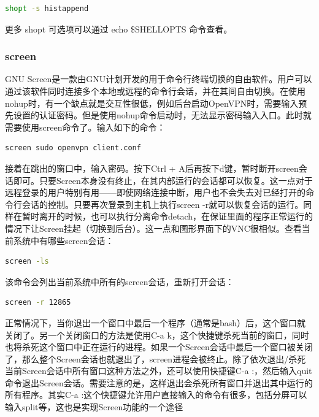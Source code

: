 \documentclass[letter]{book}
\begin{document}
\begin{lstlisting}[language=Bash]
shopt -s histappend
\end{lstlisting}

更多 shopt 可选项可以通过 echo \$SHELLOPTS 命令查看。



\subsubsection{screen}

GNU Screen是一款由GNU计划开发的用于命令行终端切换的自由软件。用户可以通过该软件同时连接多个本地或远程的命令行会话，并在其间自由切换。在使用nohup时，有一个缺点就是交互性很低，例如后台启动OpenVPN时，需要输入预先设置的认证密码。但是使用nohup命令启动时，无法显示密码输入入口。此时就需要使用screen命令了。输入如下的命令：

\begin{lstlisting}[language=Bash]
screen sudo openvpn client.conf
\end{lstlisting}

接着在跳出的窗口中，输入密码。按下Ctrl + A后再按下d键，暂时断开screen会话即可。只要Screen本身没有终止，在其内部运行的会话都可以恢复。这一点对于远程登录的用户特别有用——即使网络连接中断，用户也不会失去对已经打开的命令行会话的控制。只要再次登录到主机上执行screen -r就可以恢复会话的运行。同样在暂时离开的时候，也可以执行分离命令detach，在保证里面的程序正常运行的情况下让Screen挂起（切换到后台）。这一点和图形界面下的VNC很相似。查看当前系统中有哪些screen会话：

\begin{lstlisting}[language=Bash]
screen -ls
\end{lstlisting}

该命令会列出当前系统中所有的screen会话，重新打开会话：

\begin{lstlisting}[language=Bash]
screen -r 12865
\end{lstlisting}

正常情况下，当你退出一个窗口中最后一个程序（通常是bash）后，这个窗口就关闭了。另一个关闭窗口的方法是使用C-a k，这个快捷键杀死当前的窗口，同时也将杀死这个窗口中正在运行的进程。如果一个Screen会话中最后一个窗口被关闭了，那么整个Screen会话也就退出了，screen进程会被终止。除了依次退出/杀死当前Screen会话中所有窗口这种方法之外，还可以使用快捷键C-a :，然后输入quit命令退出Screen会话。需要注意的是，这样退出会杀死所有窗口并退出其中运行的所有程序。其实C-a :这个快捷键允许用户直接输入的命令有很多，包括分屏可以输入split等，这也是实现Screen功能的一个途径
\end{document}
